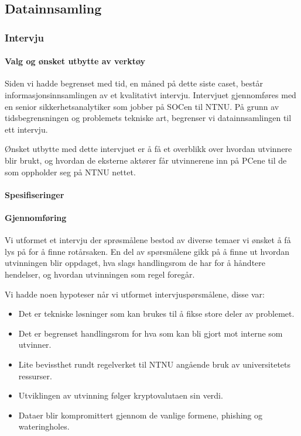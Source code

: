 \subsection{Datainnsamling}
\subsubsection{Intervju}

\paragraph{Valg og ønsket utbytte av verktøy}
Siden vi hadde begrenset med tid, en måned på dette siste caset, består informasjonsinnsamlingen av et kvalitativt intervju. Intervjuet gjennomføres med en senior sikkerhetsanalytiker som jobber på SOCen til NTNU. På grunn av tidsbegrensningen og problemets tekniske art, begrenser vi datainnsamlingen til ett intervju.

Ønsket utbytte med dette intervjuet er å få et overblikk over hvordan utvinnere blir brukt, og hvordan de eksterne aktører får utvinnerene inn på PCene til de som oppholder seg på NTNU nettet.
\paragraph{Spesifiseringer}


\paragraph{Gjennomføring}
Vi utformet et intervju der sprøsmålene bestod av diverse temaer vi ønsket å få lys på for å finne rotårsaken. En del av spørsmålene gikk på å finne ut hvordan utvinningen blir oppdaget, hva slags handlingsrom de har for å håndtere hendelser, og hvordan utvinningen som regel foregår.

Vi hadde noen hypoteser når vi utformet intervjuspørsmålene, disse var:
\begin{itemize}
    \item Det er tekniske løsninger som kan brukes til å fikse store deler av problemet.
    \item Det er begrenset handlingsrom for hva som kan bli gjort mot interne som utvinner.
    \item Lite bevissthet rundt regelverket til NTNU angående bruk av universitetets ressurser.
    \item Utviklingen av utvinning følger kryptovalutaen sin verdi.
    \item Dataer blir kompromittert gjennom de vanlige formene, phishing og wateringholes.
\end{itemize}

